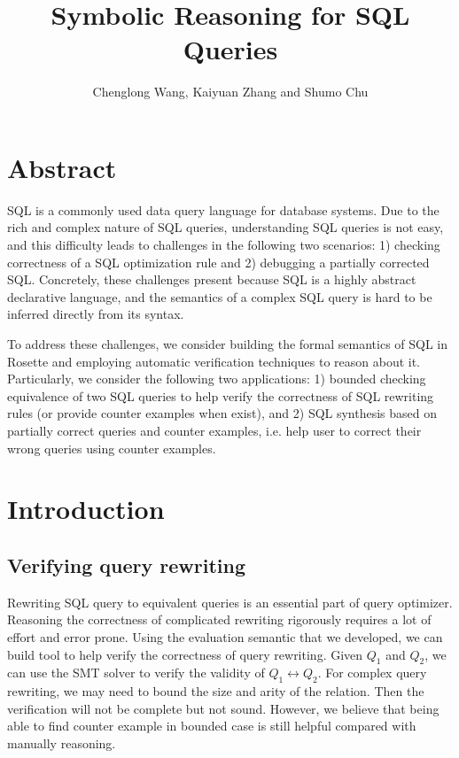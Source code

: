 \documentclass{article}
\begin{document}
\title{Symbolic Reasoning for SQL Queries}
\author{Chenglong Wang, Kaiyuan Zhang and Shumo Chu}
\date{}
\maketitle

\section*{Abstract}
SQL is a commonly used data query language for database systems. Due to the rich and complex nature of SQL queries, understanding SQL queries is not easy, and this difficulty leads to challenges in the following two scenarios: 1) checking correctness of a SQL optimization rule and 2) debugging a partially corrected SQL. Concretely, these challenges present because SQL is a highly abstract declarative language, and the semantics of a complex SQL query is hard to be inferred directly from its syntax.

To address these challenges, we consider building the formal semantics of SQL in Rosette and employing automatic verification techniques to reason about it. Particularly, we consider the following two applications: 1) bounded checking equivalence of two SQL queries to help verify the correctness of SQL rewriting rules (or provide counter examples when exist), and 2) SQL synthesis based on partially correct queries and counter examples, i.e. help user to correct their wrong queries using counter examples.

\section{Introduction}

\subsection{Verifying query rewriting}
Rewriting SQL query to equivalent queries is an essential part of query
optimizer. Reasoning the correctness of complicated rewriting rigorously 
requires a lot of effort and error prone.
Using the evaluation semantic that we developed, we can build tool to help 
verify the correctness of query rewriting. Given $Q_1$ and $Q_2$, we can use 
the SMT solver to verify the validity of $Q_1 \leftrightarrow Q_2$. 
For complex query rewriting, we may need to bound the size and arity of the
 relation. Then the verification will not be complete but not sound. 
However, we believe that being able to find counter example in bounded case is 
still helpful compared with manually reasoning. 
\end{document}
